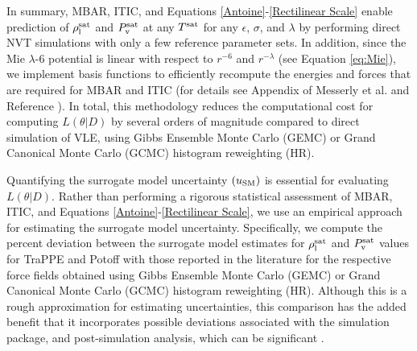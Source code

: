\documentclass[journal=jctc,manuscript=article]{achemso}
\begin{document}
In summary, MBAR, ITIC, and Equations \ref{Antoine}-\ref{Rectilinear Scale} enable prediction of $\rho_{\rm l}^{\rm sat}$ and $P_{\rm v}^{\rm sat}$ at any $T^{\rm sat}$ for any $\epsilon$, $\sigma$, and $\lambda$ by performing direct NVT simulations with only a few reference parameter sets. In addition, since the Mie $\lambda$-6 potential is linear with respect to $r^{-6}$ and $r^{-\lambda}$ (see Equation \ref{eq:Mie}), we implement basis functions to efficiently recompute the energies and forces that are required for MBAR and ITIC (for details see Appendix of Messerly et al. \cite{Postdoc_1} and Reference \cite{naden:jctc:2016}). 
In total, this methodology reduces the computational cost for computing $L(\theta|D)$ by several orders of magnitude compared to direct simulation of VLE, using Gibbs Ensemble Monte Carlo (GEMC) or Grand Canonical Monte Carlo (GCMC) histogram reweighting (HR).

Quantifying the surrogate model uncertainty $(u_{\rm SM})$ 
is essential for evaluating $L(\theta|D)$. Rather than performing a rigorous statistical assessment of MBAR, ITIC, and Equations \ref{Antoine}-\ref{Rectilinear Scale}, we use an empirical approach for estimating the surrogate model uncertainty. Specifically, we compute the percent deviation between the surrogate model estimates for $\rho_{\rm l}^{\rm sat}$ and $P_{\rm v}^{\rm sat}$ values for TraPPE and Potoff 
with those reported in the literature for the respective force fields obtained using Gibbs Ensemble Monte Carlo (GEMC) or Grand Canonical Monte Carlo (GCMC) histogram reweighting (HR). Although this is a rough approximation for estimating uncertainties, this comparison has the added benefit that it incorporates possible deviations associated with the simulation package, and post-simulation analysis, which can be significant \cite{RoundRobin}.
\end{document}
